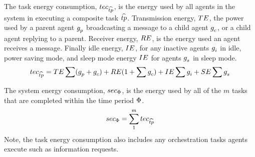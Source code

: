 \begin{definition}
	The task energy consumption, $\varTaskEnergy{}{}$, is the energy used by all agents in the system in executing a composite task $\varCompositeTask{}{}$. Transmission energy, $TE$, the power used by a parent agent $g_{p}^{}$ broadcasting a message to a child agent $g_{c}^{}$, or a child agent replying to a parent. Receiver energy, $RE$, is the energy used an agent receives a message. Finally idle energy, $IE$, for any inactive agents $g_{i}^{}$ in idle, power saving mode, and sleep mode energy $IE$ for agents $g_{s}^{}$ in sleep mode.
	\begin{equation}
		\varTaskEnergy{}{} 
		= \varTransmissionEnergy{}{} \sum (\varParentAgent{}{} + \varChildAgent{}{})
		+ \varReceiverEnergy{}{} (1 + \sum \varChildAgent{}{})
		+ \varIdleEnergy{}{} \sum \varIdleAgent{}{}
		+ \varSleepEnergy{}{} \sum \varSleepAgent{}{}
	\end{equation}
\end{definition}



\begin{definition}
	The system energy consumption, $sec_{\Phi}$, is the energy used by all of the $m$ tasks that are completed within the time period $\Phi$.
	\begin{equation}
		\varSystemEnergyConsumption{}{} 
		= \sum_{1}^{m} \varTaskEnergy{}{}
	\end{equation}
	Note, the task energy consumption also includes any orchestration tasks agents execute such as information requests.
\end{definition}

